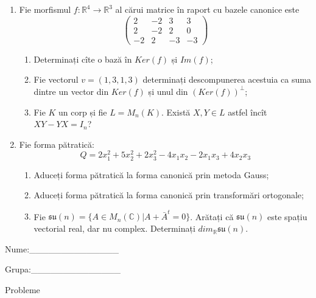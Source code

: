 \documentclass{article}
\begin{document}
\begin{enumerate}
 \item Fie morfismul $f:\mathbb{R}^4 \to \mathbb{R}^3$ al cărui matrice în raport cu bazele canonice este
$$\begin{pmatrix}
2&-2&3&3\\
2&-2&2&0\\
-2&2&-3&-3
\end{pmatrix}$$

\begin{enumerate}
\item Determinați cîte o bază în $Ker(f)$ și $Im(f)$;
\item Fie vectorul $v=(1,3,1,3)$ determinați descompunerea acestuia ca suma dintre un vector din $Ker(f)$ și unul din $(Ker(f))^\perp$;
\item Fie $K$ un corp și fie $L=M_n(K)$. Există $X,Y \in L$ astfel încît $XY-YX=I_n$?  
\end{enumerate}
\item Fie forma pătratică:
$$Q= 2x_1^2+5x_2^2+2x_3^2-4x_1x_2-2x_1x_3+4x_2x_3$$

\begin{enumerate}
\item Aduceți forma pătratică la forma canonică prin metoda Gauss;
\item Aduceți forma pătratică la forma canonică prin transformări ortogonale;
\item Fie $\mathfrak{su}(n)=\{ A \in M_n(\mathbb{C}) | A+\bar{A}^t=0\}$. Arătați că $\mathfrak{su}(n)$ este spațiu vectorial real, dar nu complex.
Determinați $dim_{\mathbb{R}}\mathfrak{su}(n)$.
\end{enumerate}
\end{enumerate}
\newpage
\begin{flushright}
Nume:\_\_\_\_\_\_\_\_\_\_\_\_\_\_
 
 
Grupa:\_\_\_\_\_\_\_\_\_\_\_\_\_\_
\end{flushright}
\begin{center}
\vspace{2cm}
{\Large Probleme}
\vspace{2cm}
\end{center}
\end{document}
